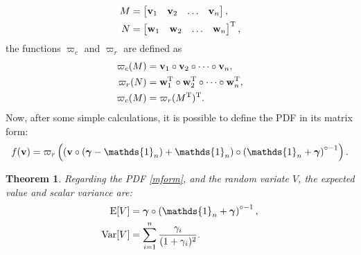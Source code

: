\documentclass{article}
\newtheorem{theorem}{Theorem}
\newcommand{\0}{\mathbbold{0}}
\newcommand{\1}{\mathds{1}}
\newcommand{\2}{\mathbbold{2}}
\newcommand{\T}{^{\operatorname{T}}}
\begin{document}
\begin{align*}
    M &= \begin{bmatrix}
        {\bf v}_1 & {\bf v}_2 & \dots & {\bf v}_n
    \end{bmatrix}, \\
    N &= \begin{bmatrix}
        {\bf w}_1 & {\bf w}_2 & \dots & {\bf w}_n
    \end{bmatrix}\T,
\end{align*}
the functions $\varpi_c$ and $\varpi_r$ are defined as
\begin{align*}
    \varpi_c(M) &= {\bf v}_1 \circ {\bf v}_2 \circ \dots \circ {\bf v}_n, \\
    \varpi_r(N) &= {\bf w}_1\T \circ {\bf w}_2\T \circ \dots \circ {\bf w}_n\T, \\
    \varpi_c(M) &= \varpi_r(M\T)\T.
\end{align*}
Now, after some simple calculations, it is possible to define the PDF in its matrix form:
\begin{equation}
    f({\bf v}) = \varpi_r\left(\left({\bf v}\circ\left({\boldsymbol \gamma} - \1_n\right) + \1_n\right)\circ \left(\1_n + {\boldsymbol \gamma}\right)^{\circ -1}\right). \label{mform}
\end{equation}
\begin{theorem}
    Regarding the PDF \eqref{mform}, and the random variate $V$, the expected value and scalar variance are:
    \begin{align}
        \textup{E}[V] &= {\boldsymbol \gamma} \circ \left(\1_n + {\boldsymbol \gamma}\right)^{\circ -1}, \label{expected2} \\
        \textup{Var}[V] &= \sum_{i=1}^{n}\frac{\gamma_i}{(1+\gamma_i)^2}. \label{variance2}
    \end{align}
\end{theorem}
\end{document}
